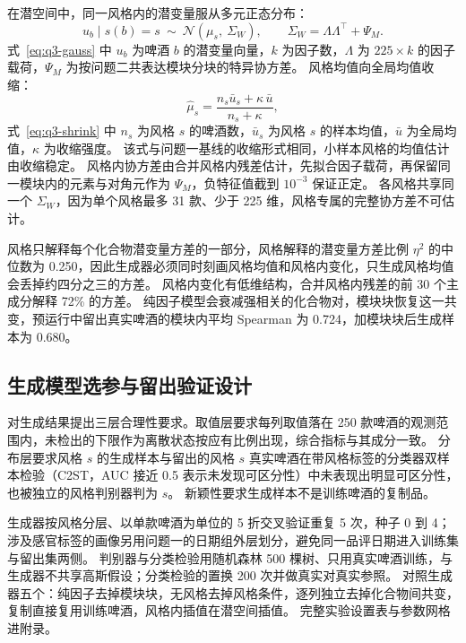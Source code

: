 在潜空间中，同一风格内的潜变量服从多元正态分布：
\begin{equation}\label{eq:q3-gauss}
u_b\mid s(b)=s\ \sim\ \mathcal N(\mu_s,\ \Sigma_W),\qquad \Sigma_W=\Lambda\Lambda^\top+\Psi_M .
\end{equation}
式~\eqref{eq:q3-gauss} 中 $u_b$ 为啤酒 $b$ 的潜变量向量，$k$ 为因子数，$\Lambda$ 为 $225\times k$ 的因子载荷，$\Psi_M$ 为按问题二共表达模块分块的特异协方差。
风格均值向全局均值收缩：
\begin{equation}\label{eq:q3-shrink}
\hat\mu_s=\frac{n_s\bar u_s+\kappa\,\bar u}{n_s+\kappa},
\end{equation}
式~\eqref{eq:q3-shrink} 中 $n_s$ 为风格 $s$ 的啤酒数，$\bar u_s$ 为风格 $s$ 的样本均值，$\bar u$ 为全局均值，$\kappa$ 为收缩强度。
该式与问题一基线的收缩形式相同，小样本风格的均值估计由收缩稳定。
风格内协方差由合并风格内残差估计，先拟合因子载荷，再保留同一模块内的元素与对角元作为 $\Psi_M$，负特征值截到 $10^{-3}$ 保证正定。
各风格共享同一个 $\Sigma_W$，因为单个风格最多 31 款、少于 225 维，风格专属的完整协方差不可估计。

风格只解释每个化合物潜变量方差的一部分，风格解释的潜变量方差比例 $\eta^2$ 的中位数为 0.250，因此生成器必须同时刻画风格均值和风格内变化，只生成风格均值会丢掉约四分之三的方差。
风格内变化有低维结构，合并风格内残差的前 30 个主成分解释 72\% 的方差。
纯因子模型会衰减强相关的化合物对，模块块恢复这一共变，预运行中留出真实啤酒的模块内平均 Spearman 为 0.724，加模块块后生成样本为 0.680。

\subsection{生成模型选参与留出验证设计}

对生成结果提出三层合理性要求。取值层要求每列取值落在 250 款啤酒的观测范围内，未检出的下限作为离散状态按应有比例出现，综合指标与其成分一致。
分布层要求风格 $s$ 的生成样本与留出的风格 $s$ 真实啤酒在带风格标签的分类器双样本检验（C2ST，AUC 接近 0.5 表示未发现可区分性）中未表现出明显可区分性，也被独立的风格判别器判为 $s$。
新颖性要求生成样本不是训练啤酒的复制品。

生成器按风格分层、以单款啤酒为单位的 5 折交叉验证重复 5 次，种子 0 到 4；涉及感官标签的画像另用问题一的日期组外层划分，避免同一品评日期进入训练集与留出集两侧。
判别器与分类检验用随机森林 500 棵树、只用真实啤酒训练，与生成器不共享高斯假设；分类检验的置换 200 次并做真实对真实参照。
对照生成器五个：纯因子去掉模块块，无风格去掉风格条件，逐列独立去掉化合物间共变，复制直接复用训练啤酒，风格内插值在潜空间插值。
完整实验设置表与参数网格进附录。

